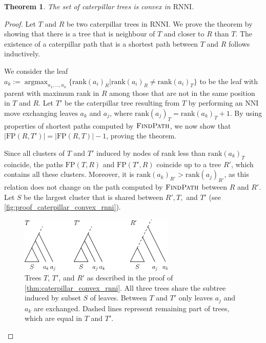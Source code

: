 \documentclass[11pt]{amsart}
\newtheorem{theorem}{Theorem}
\newcommand{\rnni}{\mathrm{RNNI}}
\newcommand{\findpath}{\textsc{FindPath}}
\newcommand{\rank}{\mathrm{rank}}
\newcommand{\nni}{\mathrm{NNI}}
\newcommand{\fp}{\mathrm{FP}}
\DeclareMathOperator*{\argmax}{argmax}
\begin{document}
\begin{theorem}
	The set of caterpillar trees is convex in $\rnni$.
	\label{thm:caterpillar_convex_rnni}
\end{theorem}

\begin{proof}
	Let $T$ and $R$ be two caterpillar trees in $\rnni$.
	We prove the theorem by showing that there is a tree that is neighbour of $T$ and closer to $R$ than $T$.
	The existence of a caterpillar path that is a shortest path between $T$ and $R$ follows inductively.

	We consider the leaf $a_k := \argmax_{a_1, \ldots, a_n}\{\rank(a_i)_R | \rank(a_i)_R \neq \rank(a_i)_T\}$ to be the leaf with parent with maximum rank in $R$ among those that are not in the same position in $T$ and $R$.
	Let $T'$ be the caterpillar tree resulting from $T$ by performing an $\nni$ move exchanging leaves $a_k$ and $a_j$, where $\rank(a_j)_T = \rank(a_k)_T + 1$.
	By using properties of shortest paths computed by $\findpath$, we now show that $|\fp(R,T')| = |\fp(R,T)| - 1$, proving the theorem.

	Since all clusters of $T$ and $T'$ induced by nodes of rank less than $\rank(a_k)_T$ coincide, the paths $\fp(T,R)$ and $\fp(T',R)$ coincide up to a tree $R'$, which contains all these clusters.
	Moreover, it is $\rank(a_k)_{R'}  > \rank(a_j)_{R'}$, as this relation does not change on the path computed by $\findpath$ between $R$ and $R'$.
	Let $S$ be the largest cluster that is shared between $R', T,$ and $T'$ (see \autoref{fig:proof_caterpillar_convex_rnni}).

	\begin{figure}[ht]
		\includegraphics[width=0.66\textwidth]{proof_caterpillar_convex_rnni.eps}
		\caption{Trees $T$, $T'$, and $R'$ as described in the proof of \autoref{thm:caterpillar_convex_rnni}.
		All three trees share the subtree induced by subset $S$ of leaves.
		Between $T$ and $T'$ only leaves $a_j$ and $a_k$ are exchanged.
		Dashed lines represent remaining part of trees, which are equal in $T$ and $T'$.}
		\label{fig:proof_caterpillar_convex_rnni}
	\end{figure}


\end{proof}
\end{document}
